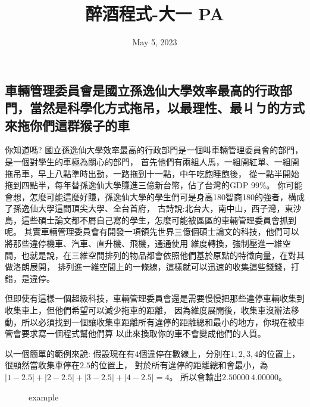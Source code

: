 \documentclass{article}
\title{醉酒程式-大一 PA}
\date{May 5, 2023}
\begin{document}
\begin{CJK*}{UTF8}{bsmi}

\maketitle

\section*{車輛管理委員會是國立孫逸仙大學效率最高的行政部門，當然是科學化方式拖吊，以最理性、最ㄐㄅ的方式來拖你們這群猴子的車}

你知道嗎? 國立孫逸仙大學效率最高的行政部門是一個叫車輛管理委員會的部門，是一個對學生的車極為關心的部門，
首先他們有兩組人馬，一組開紅單、一組開拖吊車，早上八點準時出動，一路拖到十一點，中午吃飽睡飽後，
從一點半開始拖到四點半，每年替孫逸仙大學賺進三億新台幣，佔了台灣的GDP 99\%。
你可能會想，怎麼可能這麼好賺，孫逸仙大學的學生們可是身高180智商180的強者，構成了孫逸仙大學這間頂尖大學、全台首府，
古詩說:北台大，南中山，西子灣，東沙島，這些碩士論文都不屑自己寫的學生，怎麼可能被區區的車輛管理委員會抓到呢。
其實車輛管理委員會有開發一項領先世界三億個碩士論文的科技，他們可以將那些違停機車、汽車、直升機、飛機，通通使用
維度轉換，強制壓進一維空間，也就是說，在三維空間排列的物品都會依照他們基於原點的特徵向量，在對其做洛朗展開，
排列進一維空間上的一條線，這樣就可以迅速的收集這些錢錢，打錯，是違停。

但即使有這樣一個超級科技，車輛管理委員會還是需要慢慢把那些違停車輛收集到收集車上，但他們希望可以減少拖車的距離，
因為維度展開後，收集車沒辦法移動，所以必須找到一個讓收集車距離所有違停的距離總和最小的地方，你現在被車管會要求寫一個程式幫他們算
以此來換取你的車不會變成他們的人質。

以一個簡單的範例來說: 假設現在有$4$個違停在數線上，分別在$1,2,3,4$的位置上，很顯然當收集車停在$2.5$的位置上，
對於所有違停的距離總和會最小，為$\lvert1-2.5\rvert+\lvert2-2.5\rvert+\lvert3-2.5\rvert+\lvert4-2.5\rvert=4$。
所以會輸出$2.50000\ 4.00000$。

\begin{figure}[htb]
    \vspace{-\baselineskip}  
    \begin{center}
      \caption{example}
      \label{fig:example}
    \end{center}
    \vspace{-\baselineskip}
\end{figure}


\end{CJK*}
\end{document}
